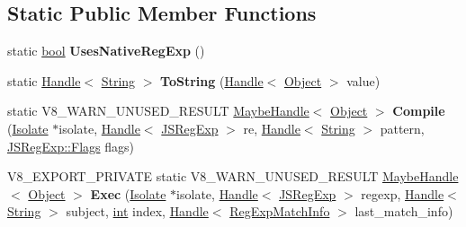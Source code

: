 \subsection*{Static Public Member Functions}
\begin{DoxyCompactItemize}
\item 
\mbox{\label{classv8_1_1internal_1_1RegExpImpl_a1f036a7e906cecf51692e724a54cbcec}} 
static \mbox{\hyperlink{classbool}{bool}} {\bfseries Uses\+Native\+Reg\+Exp} ()
\item 
\mbox{\label{classv8_1_1internal_1_1RegExpImpl_a86680c63f2568adcd0c136024d05ea85}} 
static \mbox{\hyperlink{classv8_1_1internal_1_1Handle}{Handle}}$<$ \mbox{\hyperlink{classv8_1_1internal_1_1String}{String}} $>$ {\bfseries To\+String} (\mbox{\hyperlink{classv8_1_1internal_1_1Handle}{Handle}}$<$ \mbox{\hyperlink{classv8_1_1internal_1_1Object}{Object}} $>$ value)
\item 
\mbox{\label{classv8_1_1internal_1_1RegExpImpl_a757e474c6d2ebdcbb6d05d5d2bd566ed}} 
static V8\+\_\+\+W\+A\+R\+N\+\_\+\+U\+N\+U\+S\+E\+D\+\_\+\+R\+E\+S\+U\+LT \mbox{\hyperlink{classv8_1_1internal_1_1MaybeHandle}{Maybe\+Handle}}$<$ \mbox{\hyperlink{classv8_1_1internal_1_1Object}{Object}} $>$ {\bfseries Compile} (\mbox{\hyperlink{classv8_1_1internal_1_1Isolate}{Isolate}} $\ast$isolate, \mbox{\hyperlink{classv8_1_1internal_1_1Handle}{Handle}}$<$ \mbox{\hyperlink{classv8_1_1internal_1_1JSRegExp}{J\+S\+Reg\+Exp}} $>$ re, \mbox{\hyperlink{classv8_1_1internal_1_1Handle}{Handle}}$<$ \mbox{\hyperlink{classv8_1_1internal_1_1String}{String}} $>$ pattern, \mbox{\hyperlink{classv8_1_1base_1_1Flags}{J\+S\+Reg\+Exp\+::\+Flags}} flags)
\item 
\mbox{\label{classv8_1_1internal_1_1RegExpImpl_afbb56e08c07dd09d77efa1e2dfc35ae7}} 
V8\+\_\+\+E\+X\+P\+O\+R\+T\+\_\+\+P\+R\+I\+V\+A\+TE static V8\+\_\+\+W\+A\+R\+N\+\_\+\+U\+N\+U\+S\+E\+D\+\_\+\+R\+E\+S\+U\+LT \mbox{\hyperlink{classv8_1_1internal_1_1MaybeHandle}{Maybe\+Handle}}$<$ \mbox{\hyperlink{classv8_1_1internal_1_1Object}{Object}} $>$ {\bfseries Exec} (\mbox{\hyperlink{classv8_1_1internal_1_1Isolate}{Isolate}} $\ast$isolate, \mbox{\hyperlink{classv8_1_1internal_1_1Handle}{Handle}}$<$ \mbox{\hyperlink{classv8_1_1internal_1_1JSRegExp}{J\+S\+Reg\+Exp}} $>$ regexp, \mbox{\hyperlink{classv8_1_1internal_1_1Handle}{Handle}}$<$ \mbox{\hyperlink{classv8_1_1internal_1_1String}{String}} $>$ subject, \mbox{\hyperlink{classint}{int}} index, \mbox{\hyperlink{classv8_1_1internal_1_1Handle}{Handle}}$<$ \mbox{\hyperlink{classv8_1_1internal_1_1RegExpMatchInfo}{Reg\+Exp\+Match\+Info}} $>$ last\+\_\+match\+\_\+info)

\end{DoxyCompactItemize}
